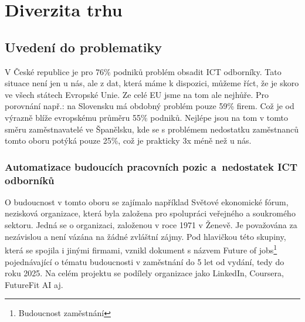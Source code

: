 \documentclass[12pt]{report}			%
\begin{document}
	
\part{Diverzita trhu}
	
	\chapter{Uvedení do problematiky}
		  V České republice je pro 76\% podniků problém obsadit ICT odborníky. Tato situace není jen u nás, ale z dat, která máme k dispozici, můžeme říct, že je skoro ve všech státech Evropské Unie. Ze celé EU jsme na tom ale nejhůře. Pro porovnání např.: na Slovensku má obdobný problém pouze 59\% firem. Což je od výrazně blíže evropskému průměru 55\% podniků. Nejlépe jsou na tom v tomto směru zaměstnavatelé ve Španělsku, kde se s problémem nedostatku zaměstnanců tomto oboru potýká pouze 25\%, což je prakticky 3x méně než u nás.\cite{EmploymentOfICTSpecialists}
		  
		\section{Automatizace budoucích pracovních pozic a~nedostatek ICT odborníků}
            O budoucnost v tomto oboru se zajímalo například Světové ekonomické fórum, nezisková organizace, která byla založena pro spolupráci veřejného a soukromého sektoru. Jedná se o organizaci, založenou v roce 1971 v Ženevě. Je považována za nezávislou a není vázána na žádné zvláštní zájmy. Pod hlavičkou této skupiny, která se spojila i jinými firmami, vznikl dokument s názvem Future of jobs\footnote{Budoucnost zaměstnání} pojednávající o tématu budoucnosti v zaměstnání do 5 let od vydání, tedy do roku 2025. Na celém projektu se podílely organizace jako LinkedIn, Coursera, FutureFit AI aj.\cite{WorldEconomicForumInfo}
            
\end{document}
